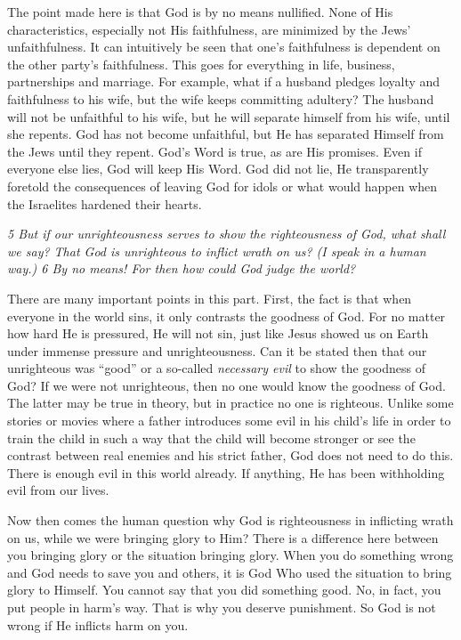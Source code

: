 The point made here is that God is by no means nullified. None of His
characteristics, especially not His faithfulness, are minimized by the
Jews' unfaithfulness. It can intuitively be seen that one's faithfulness
is dependent on the other party's faithfulness. This goes for everything
in life, business, partnerships and marriage. For example, what if a
husband pledges loyalty and faithfulness to his wife, but the wife keeps
committing adultery? The husband will not be unfaithful to his wife, but
he will separate himself from his wife, until she repents. God has not
become unfaithful, but He has separated Himself from the Jews until they
repent. God's Word is true, as are His promises. Even if everyone else
lies, God will keep His Word. God did not lie, He transparently foretold
the consequences of leaving God for idols or what would happen when the
Israelites hardened their hearts.

\emph{5 But if our unrighteousness serves to show the righteousness of
God, what shall we say? That God is unrighteous to inflict wrath on us?
(I speak in a human way.) 6 By no means! For then how could God judge
the world?}

There are many important points in this part. First, the fact is that
when everyone in the world sins, it only contrasts the goodness of God.
For no matter how hard He is pressured, He will not sin, just like Jesus
showed us on Earth under immense pressure and unrighteousness. Can it be
stated then that our unrighteous was ``good'' or a so-called
\emph{necessary evil} to show the goodness of God? If we were not
unrighteous, then no one would know the goodness of God. The latter may
be true in theory, but in practice no one is righteous. Unlike some
stories or movies where a father introduces some evil in his child's
life in order to train the child in such a way that the child will
become stronger or see the contrast between real enemies and his strict
father, God does not need to do this. There is enough evil in this world
already. If anything, He has been withholding evil from our lives.

Now then comes the human question why God is righteousness in inflicting
wrath on us, while we were bringing glory to Him? There is a difference
here between you bringing glory or the situation bringing glory. When
you do something wrong and God needs to save you and others, it is God
Who used the situation to bring glory to Himself. You cannot say that
you did something good. No, in fact, you put people in harm's way. That
is why you deserve punishment. So God is not wrong if He inflicts harm
on you.

